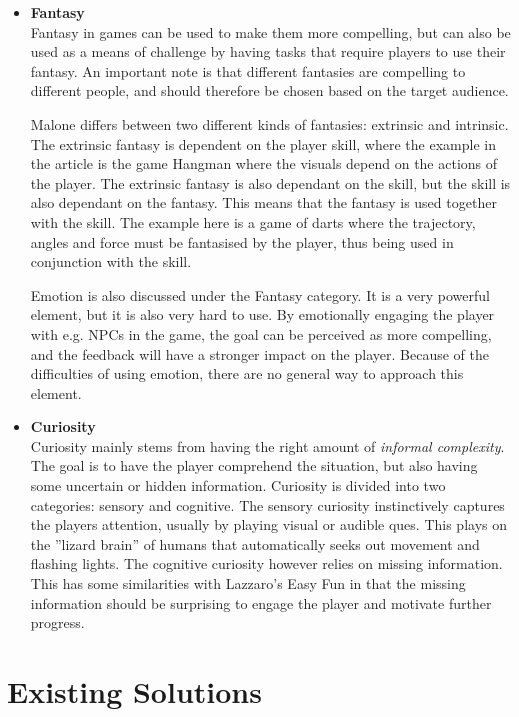\begin{itemize}
            \item \textbf{Fantasy}\\
            Fantasy in games can be used to make them more compelling, but can also be used as a means of challenge by having tasks that require players to use their fantasy. An important note is that different fantasies are compelling to different people, and should therefore be chosen based on the target audience.
            
            Malone differs between two different kinds of fantasies: extrinsic and intrinsic. The extrinsic fantasy is dependent on the player skill, where the example in the article is the game Hangman where the visuals depend on the actions of the player. The extrinsic fantasy is also dependant on the skill, but the skill is also dependant on the fantasy. This means that the fantasy is used together with the skill. The example here is a game of darts where the trajectory, angles and force must be fantasised by the player, thus being used in conjunction with the skill.
            
            Emotion is also discussed under the Fantasy category. It is a very powerful element, but it is also very hard to use. By emotionally engaging the player with e.g. NPCs in the game, the goal can be perceived as more compelling, and the feedback will have a stronger impact on the player. Because of the difficulties of using emotion, there are no general way to approach this element.
            
            \item \textbf{Curiosity}\\
            Curiosity mainly stems from having the right amount of \emph{informal complexity}. The goal is to have the player comprehend the situation, but also having some uncertain or hidden information. Curiosity is divided into two categories: sensory and cognitive. The sensory curiosity instinctively captures the players attention, usually by playing visual or audible ques. This plays on the ''lizard brain'' of humans that automatically seeks out movement and flashing lights. The cognitive curiosity however relies on missing information. This has some similarities with Lazzaro's Easy Fun in that the missing information should be surprising to engage the player and motivate further progress.
        \end{itemize}

\section{Existing Solutions}
    
